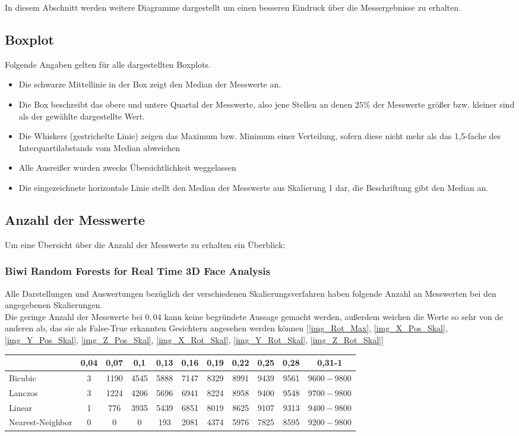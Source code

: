 \label{Abbildungen}
In diesem Abschnitt werden weitere Diagramme dargestellt um einen besseren Eindruck über die Messergebnisse zu erhalten.
\subsection*{Boxplot}
Folgende Angaben gelten für alle dargestellten Boxplots.
\begin{itemize}
	\item Die schwarze Mittellinie in der Box zeigt den Median der Messwerte an.
	\item Die Box beschreibt das obere und untere Quartal der Messwerte, also jene Stellen an denen $25\%$ der Messwerte größer bzw. kleiner sind als der gewählte dargestellte Wert.
	\item \glqq Die Whiskers (gestrichelte Linie) zeigen das Maximum bzw. Minimum einer Verteilung, sofern diese nicht mehr als das 1,5-fache des Interquartilabstands vom Median abweichen\grqq 
	\cite{wiki_Boxplot}
	\item Alle Ausreißer wurden zwecks Übersichtlichkeit weggelassen
	\item Die eingezeichnete horizontale Linie stellt den Median der Messwerte aus Skalierung 1 dar, die Beschriftung gibt den Median an.
\end{itemize}
\subsection*{Anzahl der Messwerte}
Um eine Übersicht über die Anzahl der Messwerte zu erhalten ein Überblick:
\subsubsection*{Biwi Random Forests for Real Time 3D Face Analysis \cite{database_Face_Ori}}
Alle Darstellungen und Auswertungen bezüglich der verschiedenen Skalierungsverfahren haben folgende Anzahl an Messwerten bei den angegebenen Skalierungen.\\
Die geringe Anzahl der Messwerte bei $0,04$ kann keine begründete Aussage gemacht werden, außerdem weichen die Werte so sehr von de anderen ab, das sie als False-True erkannten Gesichtern angesehen werden können
$[$\autoref{img_Rot_Max}, \autoref{img_X_Pos_Skal}, \autoref{img_Y_Pos_Skal}, \autoref{img_Z_Pos_Skal}, \autoref{img_X_Rot_Skal}, \autoref{img_Y_Rot_Skal}, \autoref{img_Z_Rot_Skal}$]$\\
\begin{tabular}{|l|c|c|c|c|c|c|c|c|c|c|}
	\hline 
	&0,04&0,07&0,1&0,13&0,16&0,19&0,22&0,25&0,28&0,31-1\\
	\hline 
	Bicubic&3&1190&4545&5888&7147&8329&8991&9439&9561&$9600-9800$\\
	\hline 
	Lanczos&3&1224&4206&5696&6941&8224&8958&9400&9548&$9700-9800$\\
	\hline 
	Linear&1&776&3935&5439&6851&8019&8625&9107&9313&$9400-9800$\\
	\hline 
	Nearest-Neighbor&0&0&0&193&2081&4374&5976&7825&8595&$9200-9800$\\ 
	\hline 
\end{tabular} 
